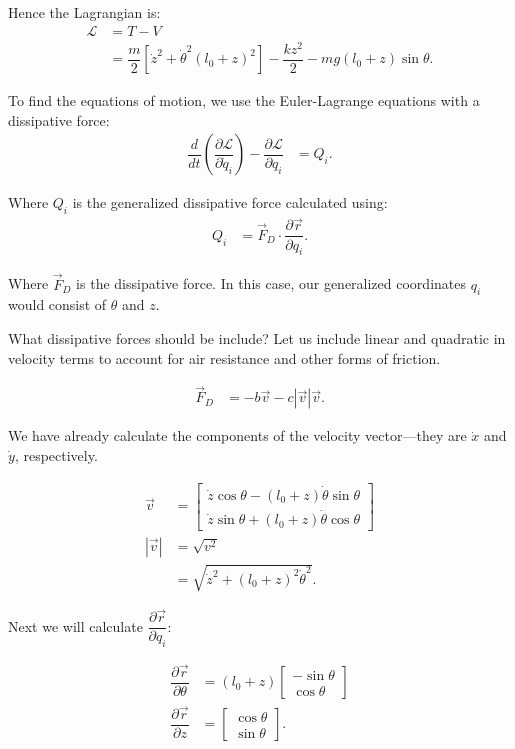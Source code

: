 \documentclass[12pt,a4paper,portrait]{article}
\begin{document}
Hence the Lagrangian is:
\begin{align*}
	\mathcal{L} &= T - V \\
	&= \dfrac{m}{2} \left[\dot{z}^2 + \dot{\theta}^2(l_0+z)^2\right] - \dfrac{kz^2}{2} - mg(l_0+z)\sin{\theta}.
\end{align*}

To find the equations of motion, we use the Euler-Lagrange equations with a dissipative force:
\begin{align}
	\dfrac{d}{dt}\left(\dfrac{\partial \mathcal{L}}{\partial \dot{q}_i}\right) - \dfrac{\partial \mathcal{L}}{\partial q_i} &= Q_i. \label{ELD}
\end{align}

Where $Q_i$ is the generalized dissipative force calculated using:
\begin{align*}
	Q_i &= \vec{F}_{D} \cdot \dfrac{\partial \vec{r}}{\partial q_i}.
\end{align*}

Where $\vec{F}_D$ is the dissipative force. In this case, our generalized coordinates $q_i$ would consist of $\theta$ and $z$. 

What dissipative forces should be include? Let us include linear and quadratic in velocity terms to account for air resistance and other forms of friction. 

\begin{align*}
	\vec{F}_D &= -b\vec{v} - c|\vec{v}|\vec{v}.
\end{align*}

We have already calculate the components of the velocity vector---they are $\dot{x}$ and $\dot{y}$, respectively. 

\begin{align*}
	\vec{v} &= \begin{bmatrix}
		\dot{z}\cos{\theta} - (l_0+z)\dot{\theta}\sin{\theta} \\
		\dot{z}\sin{\theta} + (l_0+z)\dot{\theta}\cos{\theta}
	\end{bmatrix}\\
	|\vec{v}| &= \sqrt{v^2}\\
	&= \sqrt{\dot{z}^2+(l_0+z)^2\dot{\theta}^2}.
\end{align*}

Next we will calculate $\dfrac{\partial \vec{r}}{\partial q_i}$:

\begin{align*}
	\dfrac{\partial \vec{r}}{\partial \theta} &= (l_0+z)\begin{bmatrix}
		-\sin{\theta} \\
		\cos{\theta}
	\end{bmatrix} \\
	\dfrac{\partial \vec{r}}{\partial z} &= \begin{bmatrix}
		\cos{\theta} \\
		\sin{\theta}
	\end{bmatrix}.
\end{align*}
\end{document}
